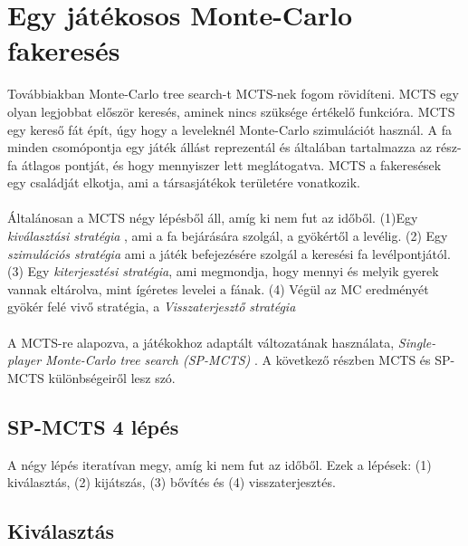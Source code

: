 \documentclass{article}
\begin{document}
	\section{Egy játékosos Monte-Carlo fakeresés}
	
	Továbbiakban Monte-Carlo tree search-t MCTS-nek fogom rövidíteni. MCTS egy olyan legjobbat először keresés, aminek nincs szüksége értékelő funkcióra. MCTS egy kereső fát épít, úgy hogy a leveleknél Monte-Carlo szimulációt használ. A fa minden csomópontja egy játék állást reprezentál és általában tartalmazza az rész-fa átlagos pontját, és hogy mennyiszer lett meglátogatva. MCTS a fakeresések egy családját elkotja, ami a társasjátékok területére vonatkozik. \cite{chaslot2006monte} \cite{coulom2006efficient} \cite{kocsis2006bandit}
	\\
	\\
	Általánosan a MCTS négy lépésből áll, amíg ki nem fut az időből. \cite{chaslot2008progressive} (1)Egy \emph{kiválasztási stratégia} , ami a fa bejárására szolgál, a gyökértől a levélig. (2) Egy \emph{szimulációs stratégia} ami a játék befejezésére szolgál a keresési fa levélpontjától. (3) Egy \emph{kiterjesztési stratégia}, ami megmondja, hogy mennyi és melyik gyerek vannak eltárolva, mint ígéretes levelei a fának. (4) Végül az MC eredményét gyökér felé vivő stratégia, a \emph{Visszaterjesztő stratégia}
	\\
	\\
	A MCTS-re alapozva, a játékokhoz adaptált változatának használata, \emph{Single-player Monte-Carlo tree search (SP-MCTS)} \cite{schadd2008single}. A következő részben MCTS és SP-MCTS különbségeiről lesz szó.
	\\
	\subsection{SP-MCTS 4 lépés}
	
	A négy lépés iteratívan megy, amíg ki nem fut az időből. Ezek a lépések: (1) kiválasztás, (2) kijátszás, (3) bővítés és (4) visszaterjesztés.
	
	\subsection{Kiválasztás}
	
\end{document}
